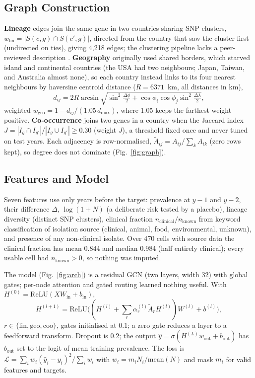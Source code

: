 \documentclass[journal]{IEEEtran}
\begin{document}
\subsection{Graph Construction}
\textbf{Lineage} edges join the same gene in two countries sharing SNP clusters, $w_{\text{lin}} = |S(c,g) \cap S(c',g)|$, directed from the country that saw the cluster first (undirected on ties), giving 4,218 edges; the clustering pipeline lacks a peer-reviewed description \cite{ref8}. \textbf{Geography} originally used shared borders, which starved island and continental countries (the USA had two neighbours; Japan, Taiwan, and Australia almost none), so each country instead links to its four nearest neighbours by haversine centroid distance ($R=6371$~km, all distances in km),
\begin{equation}
d_{ij} = 2R \arcsin\!\sqrt{ \sin^2\!\tfrac{\Delta\phi}{2} + \cos\phi_i \cos\phi_j \sin^2\!\tfrac{\Delta\lambda}{2} },
\label{eq:geo}
\end{equation}
weighted $w_{\text{geo}} = 1 - d_{ij}/(1.05\, d_{\max})$, where 1.05 keeps the farthest weight positive. \textbf{Co-occurrence} joins two genes in a country when the Jaccard index $J = |I_g \cap I_{g'}|/|I_g \cup I_{g'}| \ge 0.30$ (weight $J$), a threshold fixed once and never tuned on test years. Each adjacency is row-normalised, $\tilde{A}_{ij} = A_{ij}/\sum_k A_{ik}$ (zero rows kept), so degree does not dominate (Fig.~\ref{fig:graph}).

\subsection{Features and Model}
Seven features use only years before the target: prevalence at $y-1$ and $y-2$, their difference $\Delta$, $\log(1+N)$ (a deliberate risk tested by a placebo), lineage diversity (distinct SNP clusters), clinical fraction $n_{\text{clinical}}/n_{\text{known}}$ from keyword classification of isolation source (clinical, animal, food, environmental, unknown), and presence of any non-clinical isolate. Over 470 cells with source data the clinical fraction has mean 0.844 and median 0.984 (half entirely clinical); every usable cell had $n_{\text{known}}>0$, so nothing was imputed.

The model (Fig.~\ref{fig:arch}) is a residual GCN (two layers, width 32) with global gates; per-node attention and gated routing learned nothing useful. With $H^{(0)} = \text{ReLU}(XW_{\text{in}} + b_{\text{in}})$,
\begin{equation}
H^{(l+1)} = \text{ReLU}\big( ( H^{(l)} + \textstyle\sum_{r} \alpha_{r}^{(l)}\tilde{A}_{r}H^{(l)} ) W^{(l)} + b^{(l)} \big),
\label{eq:gcnlayer}
\end{equation}
$r \in \{\text{lin}, \text{geo}, \text{coo}\}$, gates initialised at 0.1; a zero gate reduces a layer to a feedforward transform. Dropout is 0.2; the output $\hat{y} = \sigma(H^{(L)} w_{\text{out}} + b_{\text{out}})$ has $b_{\text{out}}$ set to the logit of mean training prevalence. The loss is $\mathcal{L} = \sum_i w_i(\hat{y}_i - y_i)^2 / \sum_i w_i$ with $w_i = m_i N_i/\text{mean}(N)$ and mask $m_i$ for valid features and targets.
\end{document}
